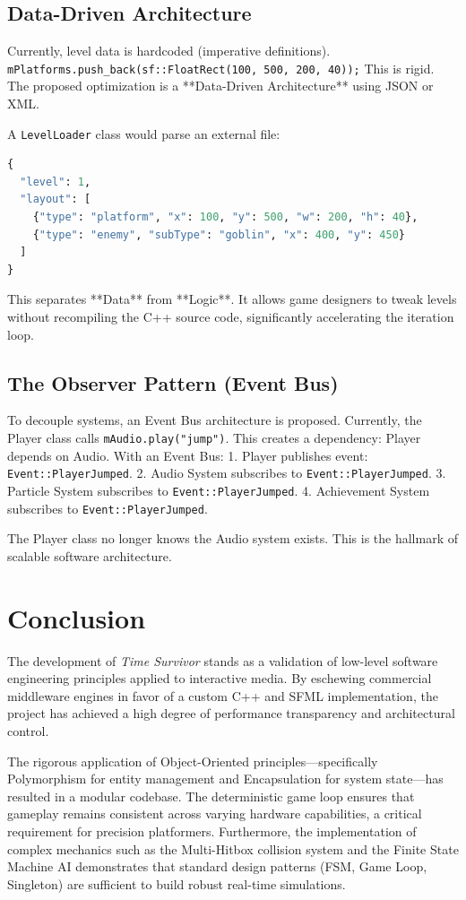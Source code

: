 \documentclass[10pt, a4paper]{article}
\begin{document}
\subsection{Data-Driven Architecture}
Currently, level data is hardcoded (imperative definitions).
\texttt{mPlatforms.push\_back(sf::FloatRect(100, 500, 200, 40));}
This is rigid. The proposed optimization is a **Data-Driven Architecture** using JSON or XML.

A \texttt{LevelLoader} class would parse an external file:
\begin{lstlisting}[language=python, caption={Level JSON Structure}]
{
  "level": 1,
  "layout": [
    {"type": "platform", "x": 100, "y": 500, "w": 200, "h": 40},
    {"type": "enemy", "subType": "goblin", "x": 400, "y": 450}
  ]
}
\end{lstlisting}
This separates **Data** from **Logic**. It allows game designers to tweak levels without recompiling the C++ source code, significantly accelerating the iteration loop.

\subsection{The Observer Pattern (Event Bus)}
To decouple systems, an Event Bus architecture is proposed. Currently, the Player class calls \texttt{mAudio.play("jump")}. This creates a dependency: Player depends on Audio.
With an Event Bus:
1. Player publishes event: \texttt{Event::PlayerJumped}.
2. Audio System subscribes to \texttt{Event::PlayerJumped}.
3. Particle System subscribes to \texttt{Event::PlayerJumped}.
4. Achievement System subscribes to \texttt{Event::PlayerJumped}.

The Player class no longer knows the Audio system exists. This is the hallmark of scalable software architecture.

\newpage

\section{Conclusion}

The development of \textit{Time Survivor} stands as a validation of low-level software engineering principles applied to interactive media. By eschewing commercial middleware engines in favor of a custom C++ and SFML implementation, the project has achieved a high degree of performance transparency and architectural control.

The rigorous application of Object-Oriented principles—specifically Polymorphism for entity management and Encapsulation for system state—has resulted in a modular codebase. The deterministic game loop ensures that gameplay remains consistent across varying hardware capabilities, a critical requirement for precision platformers. Furthermore, the implementation of complex mechanics such as the Multi-Hitbox collision system and the Finite State Machine AI demonstrates that standard design patterns (FSM, Game Loop, Singleton) are sufficient to build robust real-time simulations.
\end{document}

